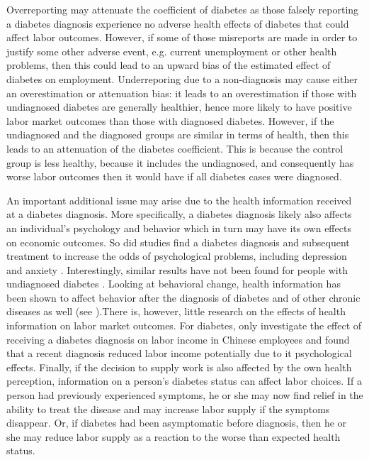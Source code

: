 \documentclass[12pt,english,british]{article}
\begin{document}
Overreporting may attenuate the coefficient of diabetes as those falsely reporting a diabetes diagnosis experience no adverse health
effects of diabetes that could affect labor outcomes. However, if some of those misreports are
made in order to justify some other adverse event, e.g. current unemployment
or other health problems, then this could lead to an upward bias
of the estimated effect of diabetes on employment. Underreporing due to
a non-diagnosis may cause either an overestimation or attenuation
bias: it leads to an overestimation if those with undiagnosed
diabetes are generally healthier, hence more likely to have
positive labor market outcomes than those with diagnosed diabetes. However, if the undiagnosed and the diagnosed groups are similar in terms of health, then this leads to an attenuation of the diabetes coefficient. This is because the control group is less healthy, because it includes the undiagnosed, and consequently has worse labor outcomes then it would have if all diabetes cases were diagnosed.

An important additional issue may arise due to the health information received at a diabetes diagnosis. More specifically, a diabetes diagnosis likely also affects an individual's psychology and
behavior which in turn may have its own effects on economic
outcomes. So did studies find a diabetes diagnosis and subsequent treatment
to increase the odds of psychological problems, including depression
and anxiety \citep{Thoolen2006a,Paddison_2011}.
Interestingly, similar results have not been found for people with
undiagnosed diabetes \citep{Nouwen2011}. Looking at behavioral change, health information  has been shown to affect behavior after the diagnosis of diabetes \citep{Slade2012} and of other chronic diseases as well (see \citep{Baird2014,Gong2015,Thornton2008,Zhao2013a}).There is, however, little research on the effects of health information on labor market outcomes. For diabetes, only \citet{Liu2014} investigate the effect of receiving a diabetes diagnosis on labor income in Chinese employees and found that a recent diagnosis reduced labor income potentially due to it psychological effects. 
Finally, if the decision to supply work is also affected by the own health perception, information on a person's diabetes status can affect labor choices. If a person had previously experienced symptoms, he or she may now find relief in the ability to treat the disease and may increase labor supply if the symptoms disappear. Or, if diabetes had been asymptomatic before diagnosis, then he or she may reduce labor supply as a reaction to the worse than expected health status.  
\end{document}
